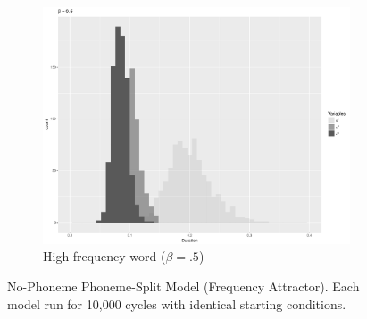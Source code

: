 \begin{figure}[h]
\begin{subfigure}[t]{.3\textwidth}
        \includegraphics[width=\linewidth]{figures/SpeakingRateFrequencybeta5.pdf}
        \caption{High-frequency word ($\beta=.5$)}
    \end{subfigure}

\caption{\label{fig:NasalizationModel1}No-Phoneme Phoneme-Split Model (Frequency Attractor). Each model run for 10,000 cycles with identical starting conditions.}\end{figure}

